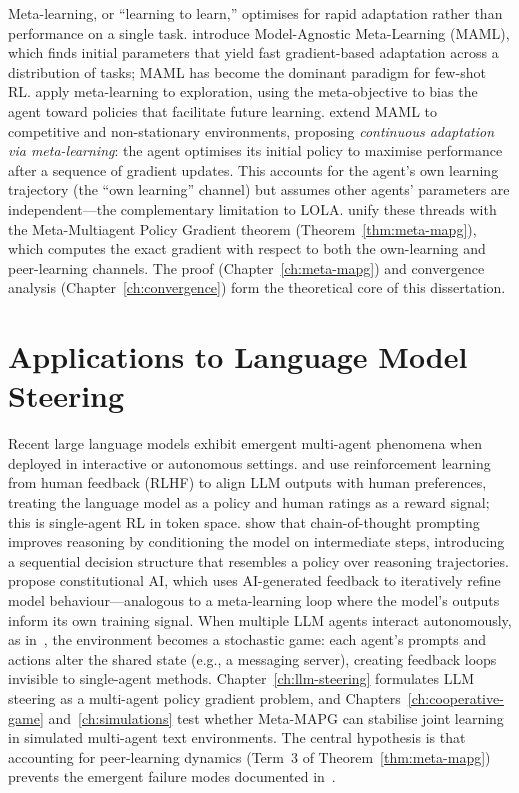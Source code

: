 Meta-learning, or ``learning to learn,'' optimises for rapid adaptation rather than performance on a single task. \citet{finn2017} introduce Model-Agnostic Meta-Learning (MAML), which finds initial parameters that yield fast gradient-based adaptation across a distribution of tasks; MAML has become the dominant paradigm for few-shot RL. \citet{stadie2018} apply meta-learning to exploration, using the meta-objective to bias the agent toward policies that facilitate future learning. \citet{alshedivat2018} extend MAML to competitive and non-stationary environments, proposing \emph{continuous adaptation via meta-learning}: the agent optimises its initial policy to maximise performance after a sequence of gradient updates. This accounts for the agent's own learning trajectory (the ``own learning'' channel) but assumes other agents' parameters are independent---the complementary limitation to LOLA. \citet{kim2021policygradientalgorithmlearning} unify these threads with the Meta-Multiagent Policy Gradient theorem (Theorem~\ref{thm:meta-mapg}), which computes the exact gradient with respect to both the own-learning and peer-learning channels. The proof (Chapter~\ref{ch:meta-mapg}) and convergence analysis (Chapter~\ref{ch:convergence}) form the theoretical core of this dissertation.

\section{Applications to Language Model Steering}
\label{sec:lit-llm-steering}

Recent large language models exhibit emergent multi-agent phenomena when deployed in interactive or autonomous settings. \citet{christiano2017} and \citet{ouyang2022} use reinforcement learning from human feedback (RLHF) to align LLM outputs with human preferences, treating the language model as a policy and human ratings as a reward signal; this is single-agent RL in token space. \citet{wei2022cot} show that chain-of-thought prompting improves reasoning by conditioning the model on intermediate steps, introducing a sequential decision structure that resembles a policy over reasoning trajectories. \citet{bai2022constitutional} propose constitutional AI, which uses AI-generated feedback to iteratively refine model behaviour---analogous to a meta-learning loop where the model's outputs inform its own training signal. When multiple LLM agents interact autonomously, as in~\cite{agentsofchaos2026}, the environment becomes a stochastic game: each agent's prompts and actions alter the shared state (e.g., a messaging server), creating feedback loops invisible to single-agent methods. Chapter~\ref{ch:llm-steering} formulates LLM steering as a multi-agent policy gradient problem, and Chapters~\ref{ch:cooperative-game} and~\ref{ch:simulations} test whether Meta-MAPG can stabilise joint learning in simulated multi-agent text environments. The central hypothesis is that accounting for peer-learning dynamics (Term~3 of Theorem~\ref{thm:meta-mapg}) prevents the emergent failure modes documented in~\cite{agentsofchaos2026}.
